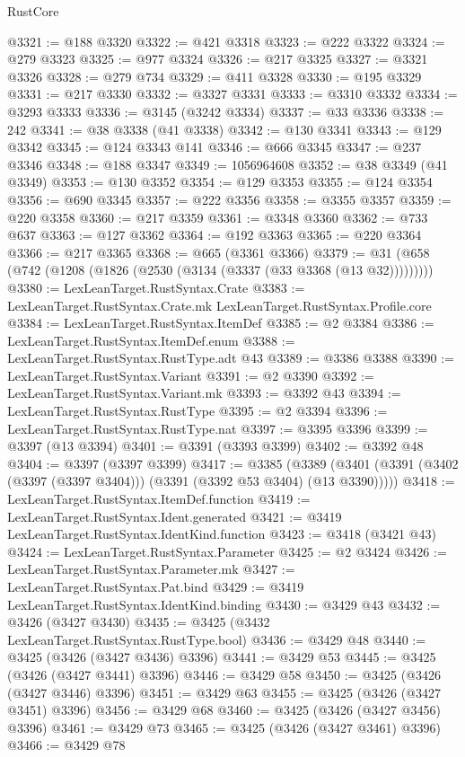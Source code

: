 \begin{lexlean}{RustCore}
\begin{coremodule}
@3321 := @188 @3320
@3322 := @421 @3318
@3323 := @222 @3322
@3324 := @279 @3323
@3325 := @977 @3324
@3326 := @217 @3325
@3327 := @3321 @3326
@3328 := @279 @734
@3329 := @411 @3328
@3330 := @195 @3329
@3331 := @217 @3330
@3332 := @3327 @3331
@3333 := @3310 @3332
@3334 := @3293 @3333
@3336 := @3145 (@3242 @3334)
@3337 := @33 @3336
@3338 := 242
@3341 := @38 @3338 (@41 @3338)
@3342 := @130 @3341
@3343 := @129 @3342
@3345 := @124 @3343 @141
@3346 := @666 @3345
@3347 := @237 @3346
@3348 := @188 @3347
@3349 := 1056964608
@3352 := @38 @3349 (@41 @3349)
@3353 := @130 @3352
@3354 := @129 @3353
@3355 := @124 @3354
@3356 := @690 @3345
@3357 := @222 @3356
@3358 := @3355 @3357
@3359 := @220 @3358
@3360 := @217 @3359
@3361 := @3348 @3360
@3362 := @733 @637
@3363 := @127 @3362
@3364 := @192 @3363
@3365 := @220 @3364
@3366 := @217 @3365
@3368 := @665 (@3361 @3366)
@3379 := @31 (@658 (@742 (@1208 (@1826 (@2530 (@3134 (@3337 (@33 @3368 (@13 @32)))))))))
@3380 := LexLeanTarget.RustSyntax.Crate
@3383 := LexLeanTarget.RustSyntax.Crate.mk LexLeanTarget.RustSyntax.Profile.core
@3384 := LexLeanTarget.RustSyntax.ItemDef
@3385 := @2 @3384
@3386 := LexLeanTarget.RustSyntax.ItemDef.enum
@3388 := LexLeanTarget.RustSyntax.RustType.adt @43
@3389 := @3386 @3388
@3390 := LexLeanTarget.RustSyntax.Variant
@3391 := @2 @3390
@3392 := LexLeanTarget.RustSyntax.Variant.mk
@3393 := @3392 @43
@3394 := LexLeanTarget.RustSyntax.RustType
@3395 := @2 @3394
@3396 := LexLeanTarget.RustSyntax.RustType.nat
@3397 := @3395 @3396
@3399 := @3397 (@13 @3394)
@3401 := @3391 (@3393 @3399)
@3402 := @3392 @48
@3404 := @3397 (@3397 @3399)
@3417 := @3385
    (@3389 (@3401 (@3391 (@3402 (@3397 (@3397 @3404))) (@3391 (@3392 @53 @3404) (@13 @3390)))))
@3418 := LexLeanTarget.RustSyntax.ItemDef.function
@3419 := LexLeanTarget.RustSyntax.Ident.generated
@3421 := @3419 LexLeanTarget.RustSyntax.IdentKind.function
@3423 := @3418 (@3421 @43)
@3424 := LexLeanTarget.RustSyntax.Parameter
@3425 := @2 @3424
@3426 := LexLeanTarget.RustSyntax.Parameter.mk
@3427 := LexLeanTarget.RustSyntax.Pat.bind
@3429 := @3419 LexLeanTarget.RustSyntax.IdentKind.binding
@3430 := @3429 @43
@3432 := @3426 (@3427 @3430)
@3435 := @3425 (@3432 LexLeanTarget.RustSyntax.RustType.bool)
@3436 := @3429 @48
@3440 := @3425 (@3426 (@3427 @3436) @3396)
@3441 := @3429 @53
@3445 := @3425 (@3426 (@3427 @3441) @3396)
@3446 := @3429 @58
@3450 := @3425 (@3426 (@3427 @3446) @3396)
@3451 := @3429 @63
@3455 := @3425 (@3426 (@3427 @3451) @3396)
@3456 := @3429 @68
@3460 := @3425 (@3426 (@3427 @3456) @3396)
@3461 := @3429 @73
@3465 := @3425 (@3426 (@3427 @3461) @3396)
@3466 := @3429 @78

\end{coremodule}
\end{lexlean}
